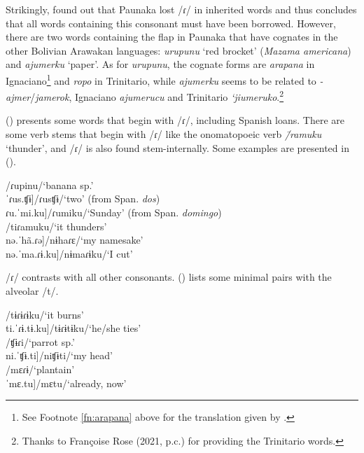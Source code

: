 Strikingly, \citet[415]{deCarvalhoPAU} found out that Paunaka lost /ɾ/ in inherited words and thus concludes that all words containing this consonant must have been borrowed. However, there are two words containing the flap in Paunaka that have cognates in the other Bolivian Arawakan languages: \textit{urupunu} ‘red brocket’ (\textit{Mazama americana}) and \textit{ajumerku} ‘paper’. As for \textit{urupunu}, the cognate forms are \textit{arapana} in Ignaciano\footnote{See Footnote \ref{fn:arapana} above for the translation given by \citet[]{OttOtt1983}.} and \textit{ropo} in Trinitario, while \textit{ajumerku} seems to be related to  \textit{-ajmer}/\textit{jamerok}, Ignaciano \textit{ajumerucu} and Trinitario \textit{‘jiumeruko}.\footnote{Thanks to Françoise Rose (2021, p.c.) %
for providing the Trinitario words.}

() presents some words that begin with /ɾ/, including Spanish loans. There are some verb stems that begin with /ɾ/ like the onomatopoeic verb \textit{\=/ramuku} ‘thunder’, and /ɾ/ is also found stem-internally. Some examples are presented in ().


\ea\label{ex:r}
\ea\label{ex:r.1}    \tab[ɾu.ˈpi.no]\tab\tab /ɾupinu/\tab ‘banana sp.’\\
   \tab{[}ˈɾus.ʧɨ]\tab\tab /ɾusʧɨ/\tab ‘two’ (from Span. \textit{dos})\\
    \tab{[}ɾu.ˈmi.ku]\tab\tab /ɾumiku/\tab ‘Sunday’ (from Span. \textit{domingo})\\
\ex\label{ex:r.2}     \tab[ti.ˈɾa.mu.kʊ]\tab /tiɾamuku/\tab ‘it thunders’\\
    \tab{[}nə.ˈhã.ɾə]\tab\tab /nɨhaɾɛ/\tab ‘my namesake’\\
    \tab{[}nə.ˈma.ɾɨ.ku]\tab /nɨmaɾɨku/\tab ‘I cut’\\%
\z
 \xe

/ɾ/ contrasts with all other consonants. () lists some minimal pairs with the alveolar /t/.

\ea\label{ex:r-t}
\ea     \tab[ti.ˈɾɨ.ɾɨ.ku]\tab /tɨɾɨɾɨku/\tab ‘it burns’\\
    \tab{[}ti.ˈɾɨ.tɨ.ku]\tab /tɨɾɨtɨku/\tab ‘he/she ties’\\
\ex    \tab[ˈʧɨ.ɾi]\tab\tab /ʧɨɾi/\tab\tab ‘parrot sp.’\\
    \tab{[}ni.ˈʧɨ.ti]\tab /niʧɨti/\tab ‘my head’\\
\ex    \tab[ˈmɛ.ɾɨ]\tab /mɛɾɨ/\tab \tab ‘plantain’\\
    \tab{[}ˈmɛ.tu]\tab /mɛtu/\tab ‘already, now’\\%
\z
\xe    

